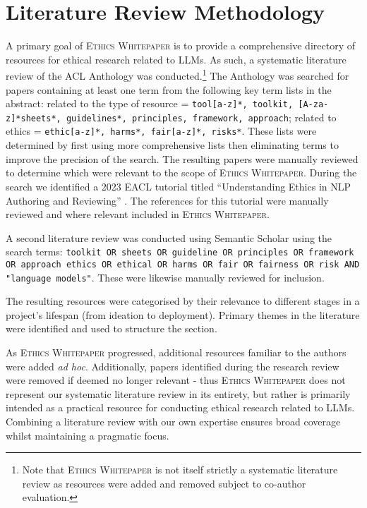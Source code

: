 \section{Literature Review Methodology}
A primary goal of \textsc{Ethics Whitepaper} is to provide a comprehensive directory of resources for ethical research related to LLMs. As such, a systematic literature review of the ACL Anthology was conducted.\footnote{Note that \textsc{Ethics Whitepaper} is not itself strictly a systematic literature review as resources were added and removed subject to co-author evaluation.} The Anthology was searched for papers containing at least one term from the following key term lists in the abstract: related to the type of resource = \texttt{tool[a-z]*, toolkit, [A-za-z]*sheets*, guidelines*, principles, framework, approach}; related to ethics = \texttt{ethic[a-z]*, harms*, fair[a-z]*, risks*}. These lists were determined by first using more comprehensive lists then eliminating terms to improve the precision of the search. 
The resulting papers were manually reviewed to determine which were relevant to the scope of \textsc{Ethics Whitepaper}. During the search we identified a 2023 EACL tutorial titled ``Understanding Ethics in NLP Authoring and Reviewing'' \citep{benotti_understanding_2023}. The references for this tutorial were manually reviewed and where relevant included in \textsc{Ethics Whitepaper}. 

A second literature review was conducted using Semantic Scholar using the search terms:  \texttt{toolkit OR sheets OR guideline OR principles OR framework OR approach ethics OR ethical OR harms OR fair OR fairness OR risk AND "language models"}. 
These were likewise manually reviewed for inclusion.

The resulting resources were categorised by their relevance to different stages in a project's lifespan (from ideation to deployment). Primary themes in the literature were identified and used to structure the section. 

As \textsc{Ethics Whitepaper} progressed, additional resources familiar to the authors were added \textit{ad hoc}. Additionally, papers identified during the research review were removed if deemed no longer relevant - thus \textsc{Ethics Whitepaper} does not represent our systematic literature review in its entirety, but rather is primarily intended as a practical resource for conducting ethical research related to LLMs. Combining a literature review with our own expertise ensures broad coverage whilst maintaining a pragmatic focus. 
